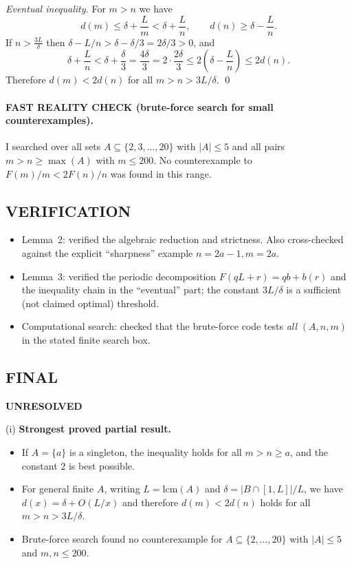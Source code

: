 \emph{Eventual inequality.} For $m>n$ we have
\[d(m)\le \delta + \frac{L}{m} < \delta + \frac{L}{n},\qquad d(n)\ge \delta - \frac{L}{n}.
\]
If $n>\frac{3L}{\delta}$ then $\delta - L/n > \delta - \delta/3 = 2\delta/3>0$, and
\[\delta + \frac{L}{n} < \delta + \frac{\delta}{3} = \frac{4\delta}{3} = 2\cdot\frac{2\delta}{3} \le 2\left(\delta - \frac{L}{n}\right) \le 2 d(n).
\]
Therefore $d(m)<2d(n)$ for all $m>n>3L/\delta$.
\qed

\paragraph{FAST REALITY CHECK (brute-force search for small counterexamples).}
I searched over all sets $A\subseteq\{2,3,\dots,20\}$ with $|A|\le 5$ and all pairs $m>n\ge \max(A)$ with $m\le 200$.
No counterexample to $F(m)/m < 2F(n)/n$ was found in this range.

\subsection*{VERIFICATION}
\begin{itemize}
\item Lemma~2: verified the algebraic reduction and strictness. Also cross-checked against the explicit ``sharpness'' example $n=2a-1,m=2a$.
\item Lemma~3: verified the periodic decomposition $F(qL+r)=qb+b(r)$ and the inequality chain in the ``eventual'' part; the constant $3L/\delta$ is a sufficient (not claimed optimal) threshold.
\item Computational search: checked that the brute-force code tests \emph{all} $(A,n,m)$ in the stated finite search box.
\end{itemize}

\subsection*{FINAL}
\textbf{UNRESOLVED}

(i) \textbf{Strongest proved partial result.}
\begin{itemize}
\item If $A=\{a\}$ is a singleton, the inequality holds for all $m>n\ge a$, and the constant $2$ is best possible.
\item For general finite $A$, writing $L=\mathrm{lcm}(A)$ and $\delta=|B\cap[1,L]|/L$, we have $d(x)=\delta+O(L/x)$ and therefore $d(m)<2d(n)$ holds for all $m>n>3L/\delta$.
\item Brute-force search found no counterexample for $A\subseteq\{2,\dots,20\}$ with $|A|\le 5$ and $m,n\le 200$.
\end{itemize}

